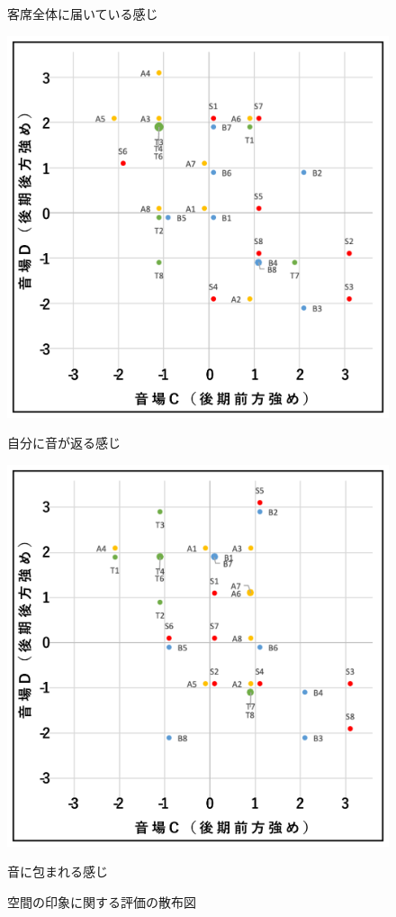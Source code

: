 \documentclass[11pt,a4j]{jreport}
\begin{document}
\begin{figure}[H]
\begin{minipage}{0.5\linewidth}
    \caption*{客席全体に届いている感じ}
  \end{minipage}
  \begin{minipage}{.5\linewidth}
    \centering
    \includegraphics[width=.9\linewidth]{images/subjectiveExp/scat_late_06returnSelf.png}
    \caption*{自分に音が返る感じ}
  \end{minipage}%
  \begin{minipage}{.5\linewidth}
    \centering
    \includegraphics[width=.9\linewidth]{images/subjectiveExp/scat_late_07surrounded.png}
    \caption*{音に包まれる感じ}
  \end{minipage}

  \caption{空間の印象に関する評価の散布図}
  \label{fig:空間の印象に関する評価の散布図}
\end{figure}
\end{document}
